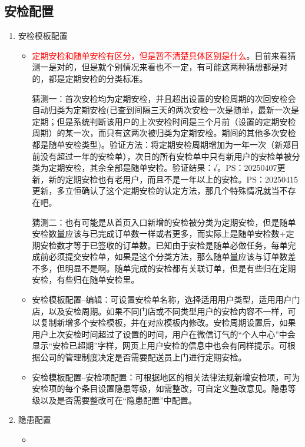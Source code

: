 \documentclass[UTF8]{ctexart}
\begin{document}
\subsection{安检配置}
\begin{enumerate}
	\item 安检模板配置
	
	\begin{itemize}
		

	\item \textcolor{red}{定期安检和随单安检有区分，但是暂不清楚具体区别是什么}。目前来看猜测一是对的，但是就个别情况来看也不一定，有可能这两种猜想都是对的，都是定期安检的分类标准。
	
	猜测一：首次安检均为定期安检，并且超出设置的安检周期的次回安检会自动归类为定期安检(已查到间隔三天的两次安检一次是随单，最新一次是定期；但是系统判断该用户的上次安检时间是三个月前（设置的定期安检周期）的某一次，而只有这两次被归类为定期安检。期间的其他多次安检都是随单安检类型)。验证方法：将定期安检周期增加为一年一次（新郑目前没有超过一年的安检单），次日的所有安检单中只有新用户的安检单被分类为定期安检，其余全部是随单安检。验证结果：√。PS：20250407更新，新的定期安检也有老用户，而且不是一年以上的安检。PS：20250415更新，多立恒确认了这个定期安检的认定方法，那几个特殊情况就当不存在吧。
	
	猜测二：也有可能是从首页入口新增的安检被分类为定期安检，但是随单安检数量应该与已完成订单数一样或者更多，而实际上是随单安检数+定期安检数才等于已签收的订单数。已知由于安检是随单必做任务，每单完成前必须提交安检单，如果是这个分类方法，那么随单量应该与订单数差不多，但明显不是啊。随单完成的安检都有关联订单，但是有些归在定期安检，有些归在随单安检里。
	
	\item 安检模板配置--编辑：可设置安检单名称，选择适用用户类型，适用用户门店，以及安检周期。如果不同门店或不同类型用户的安检内容不一样，可以复制新增多个安检模板，并在对应模板内修改。安检周期设置后，如果用户上次安检时间超过了设置的时间，用户在微信订气的“个人中心”中会显示“安检已超期”字样，网页上用户安检的信息中也会有同样提示。可根据公司的管理制度决定是否需要配送员上门进行定期安检。
	
    \item 安检模板配置--安检项配置：可根据地区的相关法律法规新增安检项，可为安检项的每个条目设置隐患等级，如需整改，可自定义整改意见。隐患等级以及是否需要整改可在“隐患配置”中配置。
	
	\end{itemize}
	
	\item 隐患配置
	\begin{itemize}
		\item 
	

\end{itemize}
\end{enumerate}
\end{document}
